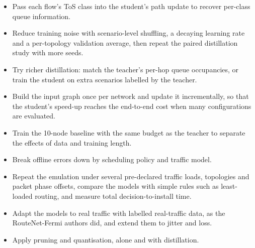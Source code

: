 \begin{itemize}
  \item Pass each flow's ToS class into the student's path update to recover per-class queue information.
  \item Reduce training noise with scenario-level shuffling, a decaying learning rate and a per-topology validation average, then repeat the paired distillation study with more seeds.
  \item Try richer distillation: match the teacher's per-hop queue occupancies, or train the student on extra scenarios labelled by the teacher.
  \item Build the input graph once per network and update it incrementally, so that the student's speed-up reaches the end-to-end cost when many configurations are evaluated.
  \item Train the 10-node baseline with the same budget as the teacher to separate the effects of data and training length.
  \item Break offline errors down by scheduling policy and traffic model.
  \item Repeat the emulation under several pre-declared traffic loads, topologies and packet phase offsets, compare the models with simple rules such as least-loaded routing, and measure total decision-to-install time.
  \item Adapt the models to real traffic with labelled real-traffic data, as the RouteNet-Fermi authors did, and extend them to jitter and loss.
  \item Apply pruning and quantisation, alone and with distillation.
\end{itemize}
